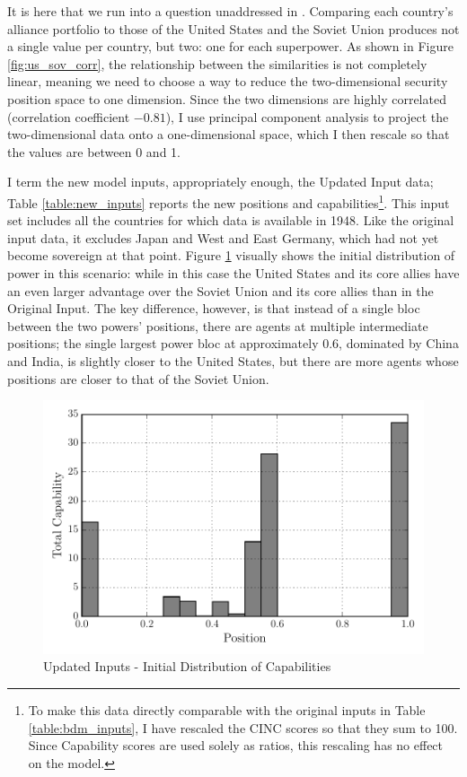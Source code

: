 It is here that we run into a question unaddressed in \citet{bdm_1998}. Comparing each country's alliance portfolio to those of the United States and the Soviet Union produces not a single value per country, but two: one for each superpower. As shown in Figure \ref{fig:us_sov_corr}, the relationship between the similarities is not completely linear, meaning we need to choose a way to reduce the two-dimensional security position space to one dimension. Since the two dimensions are highly correlated (correlation coefficient $-0.81$), I use principal component analysis \citep{tipping_1999} to project the two-dimensional data onto a one-dimensional space, which I then rescale so that the values are between 0 and 1.

I term the new model inputs, appropriately enough, the Updated Input data; Table \ref{table:new_inputs} reports the new positions and capabilities\footnote{To make this data directly comparable with the original inputs in Table \ref{table:bdm_inputs}, I have rescaled the CINC scores so that they sum to 100. Since Capability scores are used solely as ratios, this rescaling has no effect on the model.}. This input set includes all the countries for which data is available in 1948. Like the original input data, it excludes Japan and West and East Germany, which had not yet become sovereign at that point. 
Figure \ref{fig:updated_input_hist} visually shows the initial distribution of power in this scenario: while in this case the United States and its core allies have an even larger advantage over the Soviet Union and its core allies than in the Original Input. The key difference, however, is that instead of a single bloc between the two powers' positions, there are agents at multiple intermediate positions; the single largest power bloc at approximately 0.6, dominated by China and India, is slightly closer to the United States, but there are more agents whose positions are closer to that of the Soviet Union.

\begin{figure}[h!]
  \centering
  \includegraphics[scale=0.75]{ColdWar/Figures/Updated_Inputs_hist}
  \caption[Updated Inputs]{Updated Inputs - Initial Distribution of Capabilities}
  \label{fig:updated_input_hist}
  \figSpace
 \end{figure}

